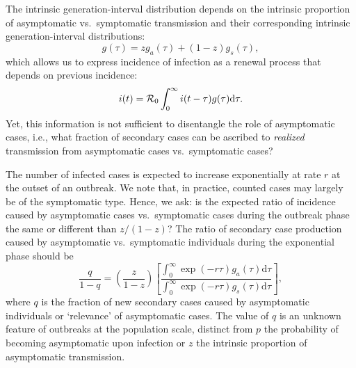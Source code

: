 The intrinsic generation-interval distribution depends on the intrinsic proportion of asymptomatic vs.~symptomatic transmission and their corresponding intrinsic generation-interval distributions:
\begin{equation}
g(\tau) = z g_a(\tau) + (1-z) g_s(\tau),
\end{equation}
which allows us to express incidence of infection as a renewal process that depends on previous incidence:
\begin{equation}
i(t) = {\cal{R}}_{0} \int_0^\infty i(t-\tau) g(\tau) \mathrm{d} \tau.
\end{equation}
Yet, this information is not sufficient to disentangle the role of asymptomatic cases, i.e., what fraction of secondary cases can be ascribed to \emph{realized} transmission from asymptomatic cases vs.~symptomatic cases?

The number of infected cases is expected to increase exponentially at rate $r$ at the outset of an outbreak. We note that, in practice, counted cases may largely be of the symptomatic type.
Hence, we ask: is the expected ratio of incidence caused by asymptomatic cases vs.~symptomatic cases during the outbreak phase the same or different than $z/(1-z)$?
The ratio of secondary case production caused by asymptomatic vs.~symptomatic individuals during the exponential phase should be
\begin{equation}
\frac{q}{1-q}=\left(\frac{z}{1-z}\right)\left[\frac{\int_0^\infty \exp(-r\tau) g_a(\tau) \mathrm{d}\tau}{\int_0^\infty \exp(-r\tau) g_s(\tau) \mathrm{d}\tau}\right],
\label{eq.qratio}
\end{equation}
where $q$ is the fraction of new secondary cases caused by asymptomatic individuals or `relevance' of asymptomatic cases. 
The value of $q$ is an unknown feature of outbreaks at the population scale, distinct from $p$ the probability of becoming asymptomatic upon infection or $z$ the intrinsic proportion of asymptomatic transmission.

